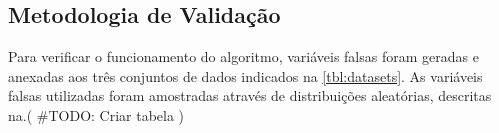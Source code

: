 \subsection{Metodologia de Validação}

Para verificar o funcionamento do algoritmo, variáveis falsas foram geradas e anexadas aos três conjuntos de 
dados indicados na \ref{tbl:datasets}. As variáveis falsas utilizadas foram amostradas através de distribuições
aleatórias, descritas na.( \#TODO: Criar tabela )